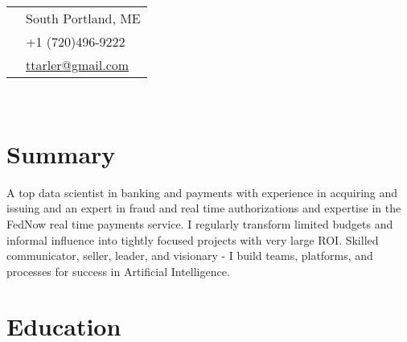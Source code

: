 \documentclass[10pt]{article} %
\begin{document}
\hfill
\begin{minipage}[t]{0.44\textwidth} %
\vspace{0pt} %


\colorbox{shade}{\textcolor{text}{
\begin{tabular}{c|p{7cm}}
\raisebox{-4pt}{} & South Portland, ME\\ %
\raisebox{-3pt}{} & +1 (720)496-9222 \\ %
\raisebox{-1pt}{} & \href{mailto:ttarler@gmail.com}{ttarler@gmail.com} \\ %
\end{tabular}
}
}\\[10pt]


\section{Summary} 

A top data scientist in banking and payments with experience in acquiring and issuing and an expert in fraud and real time authorizations and expertise in the FedNow real time payments service. I regularly transform limited budgets and informal influence into tightly focused projects with very large ROI. Skilled communicator, seller,  leader, and visionary - I build teams, platforms, and processes for success in Artificial Intelligence. 

	

\section{Education} 

\begin{tabular}{rl} %



\end{tabular}
\end{minipage}
\end{document}

